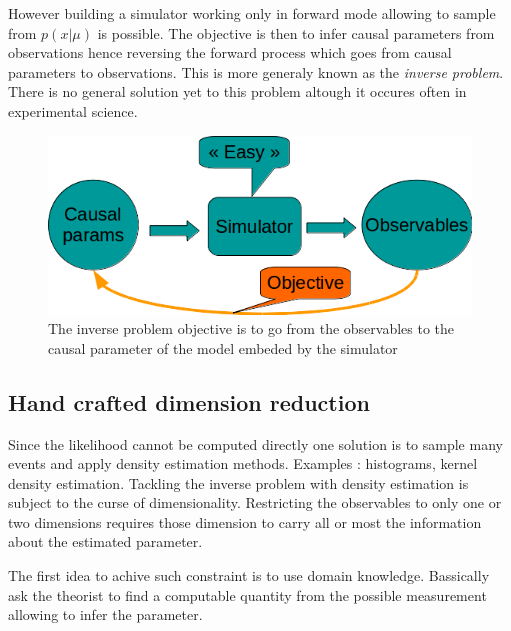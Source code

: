 However building a simulator working only in forward mode allowing to sample from $p(x|\mu)$ is possible.
The objective is then to infer causal parameters from observations hence reversing the forward process which goes from causal parameters to observations.
This is more generaly known as the \emph{inverse problem}.
There is no general solution yet to this problem altough it occures often in experimental science.


\begin{figure}[htb]
    \centering
    \includegraphics[width=0.8\linewidth]{inverse_problem}
    \caption{The inverse problem objective is to go from the observables to the causal parameter of the model embeded by the simulator}
    \label{fig:inverse_problem}
\end{figure}






\subsection{Hand crafted dimension reduction} %
\label{sub:hand_crafted_dimension_reduction}

Since the likelihood cannot be computed directly one solution is to sample many events and apply density estimation methods.
Examples : histograms, kernel density estimation.
Tackling the inverse problem with density estimation is subject to the curse of dimensionality.
Restricting the observables to only one or two dimensions requires those dimension to carry all or most the information about the estimated parameter.

The first idea to achive such constraint is to use domain knowledge.
Bassically ask the theorist to find a computable quantity from the possible measurement allowing to infer the parameter.



